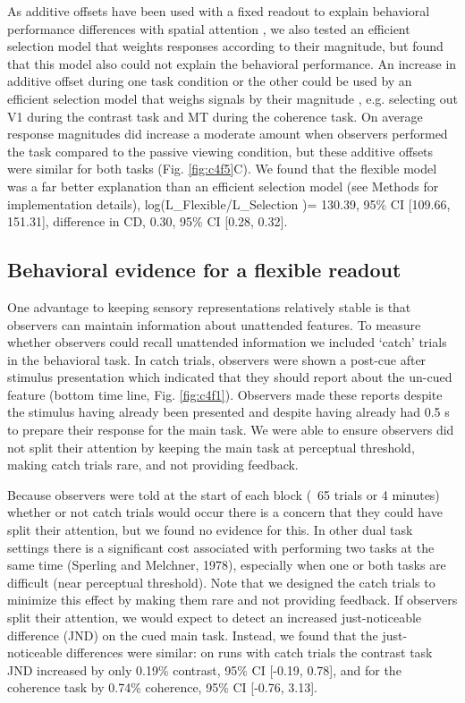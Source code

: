 \documentclass{report}
\begin{document}
As additive offsets have been used with a fixed readout to explain behavioral performance differences with spatial attention \citep{Pestilli2011-gi}, we also tested an efficient selection model that weights responses according to their magnitude, but found that this model also could not explain the behavioral performance. An increase in additive offset during one task condition or the other could be used by an efficient selection model that weighs signals by their magnitude \citep{Hara2014-mv,Pestilli2011-gi}, e.g. selecting out V1 during the contrast task and MT during the coherence task. On average response magnitudes did increase a moderate amount when observers performed the task compared to the passive viewing condition, but these additive offsets were similar for both tasks (Fig. \ref{fig:c4f5}C). We found that the flexible model was a far better explanation than an efficient selection model (see Methods for implementation details), log⁡(L_Flexible/L_Selection )= 130.39, 95\% CI [109.66, 151.31], difference in CD, 0.30, 95\% CI [0.28, 0.32]. 

\subsection{Behavioral evidence for a flexible readout}

One advantage to keeping sensory representations relatively stable is that observers can maintain information about unattended features. To measure whether observers could recall unattended information we included ‘catch’ trials in the behavioral task. In catch trials, observers were shown a post-cue after stimulus presentation which indicated that they should report about the un-cued feature (bottom time line, Fig. \ref{fig:c4f1}). Observers made these reports despite the stimulus having already been presented and despite having already had 0.5 s to prepare their response for the main task. We were able to ensure observers did not split their attention by keeping the main task at perceptual threshold, making catch trials rare, and not providing feedback.

Because observers were told at the start of each block (~65 trials or 4 minutes) whether or not catch trials would occur there is a concern that they could have split their attention, but we found no evidence for this. In other dual task settings there is a significant cost associated with performing two tasks at the same time (Sperling and Melchner, 1978), especially when one or both tasks are difficult (near perceptual threshold). Note that we designed the catch trials to minimize this effect by making them rare and not providing feedback. If observers split their attention, we would expect to detect an increased just-noticeable difference (JND) on the cued main task. Instead, we found that the just-noticeable differences were similar: on runs with catch trials the contrast task JND increased by only 0.19\% contrast, 95\% CI [-0.19, 0.78], and for the coherence task by 0.74\% coherence, 95\% CI [-0.76, 3.13].  
\end{document}
